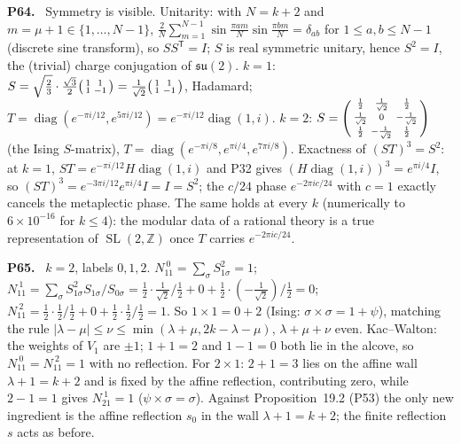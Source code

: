\documentclass[11pt]{article}
\newcommand{\Z}{\mathbb{Z}}
\newcommand{\SL}{\operatorname{SL}}
\newenvironment{solution}[1]{\medskip\noindent\textbf{P#1.}\ }{\par\medskip}
\begin{document}
\begin{solution}{64}
Symmetry is visible. Unitarity: with $N = k+2$ and $m = \mu+1\in\{1,\dots,N-1\}$,
$\frac2N\sum_{m=1}^{N-1}\sin\frac{\pi am}N\sin\frac{\pi bm}N = \delta_{ab}$ for
$1\le a,b\le N-1$ (discrete sine transform), so $SS^{\mathsf T} = I$; $S$ is real
symmetric unitary, hence $S^2 = I$, the (trivial) charge conjugation of
$\mathfrak{su}(2)$. $k=1$: $S = \sqrt{\tfrac23}\cdot\tfrac{\sqrt3}2\begin{psmallmatrix}1&1\\1&-1\end{psmallmatrix}
= \tfrac1{\sqrt2}\begin{psmallmatrix}1&1\\1&-1\end{psmallmatrix}$, Hadamard;
$T = \operatorname{diag}(e^{-\pi i/12},e^{5\pi i/12}) = e^{-\pi i/12}\operatorname{diag}(1,i)$.
$k=2$: $S = \begin{psmallmatrix}\frac12&\frac1{\sqrt2}&\frac12\\ \frac1{\sqrt2}&0&-\frac1{\sqrt2}\\ \frac12&-\frac1{\sqrt2}&\frac12\end{psmallmatrix}$
(the Ising $S$-matrix), $T = \operatorname{diag}(e^{-\pi i/8},e^{\pi i/4},e^{7\pi i/8})$.
Exactness of $(ST)^3 = S^2$: at $k = 1$, $ST = e^{-\pi i/12}H\operatorname{diag}(1,i)$
and P32 gives $(H\operatorname{diag}(1,i))^3 = e^{\pi i/4}I$, so
$(ST)^3 = e^{-3\pi i/12}e^{\pi i/4}I = I = S^2$; the $c/24$ phase
$e^{-2\pi i c/24}$ with $c = 1$ exactly cancels the metaplectic phase. The
same holds at every $k$ (numerically to $6\times10^{-16}$ for $k\le4$): the
modular data of a rational theory is a true representation of $\SL(2,\Z)$
once $T$ carries $e^{-2\pi ic/24}$.
\end{solution}

\begin{solution}{65}
$k=2$, labels $0,1,2$. $N_{11}^{\ 0} = \sum_\sigma S_{1\sigma}^2 = 1$;
$N_{11}^{\ 1} = \sum_\sigma S_{1\sigma}^2S_{1\sigma}/S_{0\sigma}
= \tfrac12\cdot\tfrac{1}{\sqrt2}/\tfrac12 + 0 + \tfrac12\cdot(-\tfrac1{\sqrt2})/\tfrac12 = 0$;
$N_{11}^{\ 2} = \tfrac12\cdot\tfrac12/\tfrac12 + 0 + \tfrac12\cdot\tfrac12/\tfrac12 = 1$.
So $1\times1 = 0+2$ (Ising: $\sigma\times\sigma = 1+\psi$), matching the rule
$|\lambda-\mu|\le\nu\le\min(\lambda+\mu,2k-\lambda-\mu)$, $\lambda+\mu+\nu$ even.
Kac--Walton: the weights of $V_1$ are $\pm1$; $1+1 = 2$ and $1-1 = 0$ both lie
in the alcove, so $N_{11}^{\ 0} = N_{11}^{\ 2} = 1$ with no reflection. For
$2\times1$: $2+1 = 3$ lies on the affine wall $\lambda+1 = k+2$ and is fixed by
the affine reflection, contributing zero, while $2-1 = 1$ gives $N_{21}^{\ 1} = 1$
($\psi\times\sigma = \sigma$). Against Proposition~19.2 (P53) the
only new ingredient is the affine reflection $s_0$ in the wall
$\lambda+1 = k+2$; the finite reflection $s$ acts as before.
\end{solution}
\end{document}
